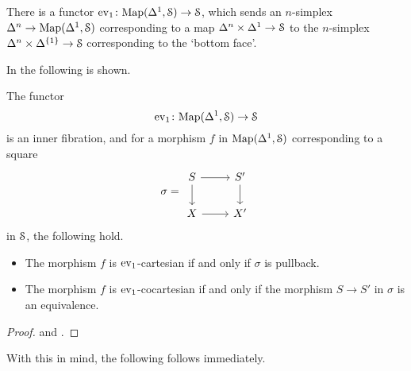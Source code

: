 \documentclass[main.tex]{subfiles}
\begin{document}
There is a functor $\ev_{1}\colon \Map(\Delta^{1}, \S) \to \S$, which sends an $n$-simplex $\Delta^{n} \to \Map(\Delta^{1}, \S)$ corresponding to a map $\Delta^{n} \times \Delta^{1} \to \S$ to the $n$-simplex $\Delta^{n} \times \Delta^{\{1\}} \to \S$ corresponding to the `bottom face'.

In \cite{highertopostheory} the following is shown.

\begin{proposition}
  The functor
  \begin{equation}
    \label{eq:ev1}
    \ev_{1}\colon \Map(\Delta^{1}, \S) \to \S
  \end{equation}
  is an inner fibration, and for a morphism $f$ in $\Map(\Delta^{1}, \S)$ corresponding to a square
  \begin{equation*}
    \sigma = 
    \begin{tikzcd}
      S
      \arrow[r]
      \arrow[d]
      & S'
      \arrow[d]
      \\
      X
      \arrow[r]
      & X'
    \end{tikzcd}
  \end{equation*}
  in $\S$, the following hold.
  \begin{itemize}
    \item The morphism $f$ is $\ev_{1}$-cartesian if and only if $\sigma$ is pullback.

    \item The morphism $f$ is $\ev_{1}$-cocartesian if and only if the morphism $S \to S'$ in $\sigma$ is an equivalence.
  \end{itemize}
\end{proposition}
\begin{proof}
  \cite[Lem.~6.1.1.1]{highertopostheory} and \cite[Lemma 2.4.7.12]{highertopostheory}.
\end{proof}

With this in mind, the following follows immediately.
\end{document}
